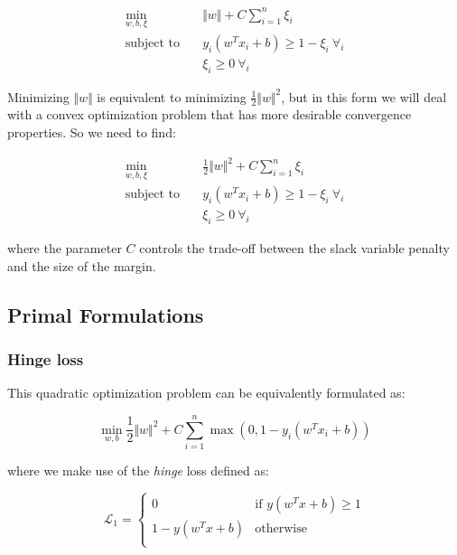 \begin{equation}
    \begin{aligned}
        \min_{w,b,\xi} \quad & \Vert w \Vert + C \sum_{i=1}^{n} \xi_i \\
            \textrm{subject to} \quad & y_i (w^T x_i + b) \geq 1 - \xi_i \ \forall_i \\ & \xi_i \geq 0 \ \forall_i
    \end{aligned} \label{eq:svc_obj}
\end{equation}

Minimizing $\Vert w\Vert$ is equivalent to minimizing $\displaystyle \frac{1}{2}\Vert w\Vert^{2}$, but in this form we will deal with a convex optimization problem that has more desirable convergence properties. So we need to find:

\begin{equation}
    \begin{aligned}
        \min_{w,b,\xi} \quad & \frac{1}{2} \Vert w \Vert^2 + C \sum_{i=1}^{n} \xi_i \\
            \textrm{subject to} \quad & y_i (w^T x_i + b) \geq 1 - \xi_i \ \forall_i \\ & \xi_i \geq 0 \ \forall_i
    \end{aligned} \label{eq:quad_svc_obj}
\end{equation}

where the parameter $C$ controls the trade-off between the slack variable penalty and the size of the margin.

\subsection{Primal Formulations}

\subsubsection{Hinge loss}

This quadratic optimization problem can be equivalently formulated as: 

\begin{equation}
    \min_{w,b} \frac{1}{2} \Vert w \Vert^2 + C \sum_{i=1}^n \max(0, 1 - y_i (w^T x_i + b)) \label{eq:svc_hinge}
\end{equation}

where we make use of the \emph{hinge} loss defined as:

\begin{equation}
	\mathcal{L}_1 = 
	\begin{cases}
		0 & \text{if } y (w^T x + b) \geq 1 \\
		1 - y (w^T x + b) & \text{otherwise} \\
	\end{cases} \label{eq:hinge1}
\end{equation}

